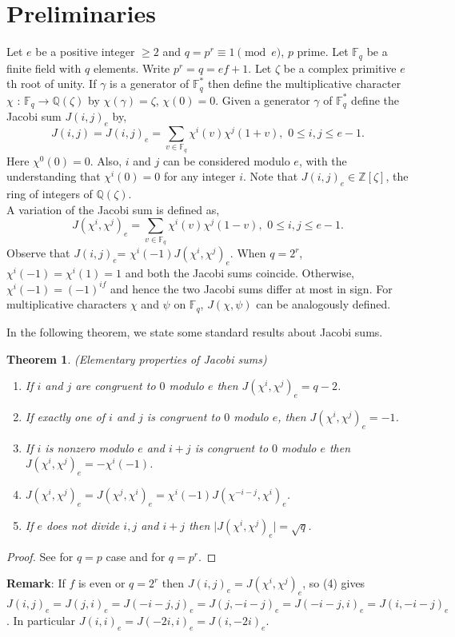 \documentclass[a4paper,12pt]{article}
\newtheorem{theorem}{Theorem}[section]
\def\F{{\mathbb F}}
\def\Q{{\mathbb Q}}                               %
\def\Z{{\mathbb Z}}                               %
\def\vpmod{\!\!\!\pmod}
\begin{document}
\section{Preliminaries}
Let $e$ be a positive integer $\ge 2$ and  $q=p^{r}\equiv 1\vpmod{e}$, $p$ prime. Let $\F_{q}$ be a finite field with $q$ elements. Write $p^{r}=q= ef + 1$. Let $\zeta$ be a complex primitive $e$th root of unity. If $\gamma$ is a generator of $\F_{q}^{*}$ then define the multiplicative character $\chi$ : $\F_{q}\rightarrow \Q(\zeta)$ by $\chi(\gamma) =\zeta$, $\chi(0)= 0$.
\noindent Given a generator $\gamma$ of $\F_{q}^{*}$ define the Jacobi sum $J(i,j)_{e}$ by,
$$J(i,j) = J(i,j)_{e} = \sum_{v\in \F_{q}}\chi^{i}(v)\chi^{j}(1+v),\,\, 0\leq i,j\leq e-1.$$
Here $\chi^{0}(0) = 0$. Also, $i$ and $j$ can be considered modulo $e$, with the understanding that $\chi^{i}(0) = 0$ for any integer $i$. Note that $J(i,j)_{e} \in \Z[\zeta]$, the ring of integers of $\Q(\zeta).$\\
\indent A variation of the Jacobi sum is defined as,
$$J(\chi^{i},\chi^{j})_{e} = \sum_{v\in \F_{q}}\chi^{i}(v)\chi^{j}(1-v),\,\,0\leq i, j\leq e-1.$$
Observe that $J(i,j)_{e}$= $\chi^{i}(-1)J(\chi^{i},\chi^{j})_{e}$. 
When $q = 2^r$, $\chi^{i}(-1) = \chi^{i}(1) =1$ and both the Jacobi sums coincide. 
Otherwise, $\chi^{i}(-1) = (-1)^{if}$ and hence the two Jacobi sums differ at most in sign.
 For multiplicative characters $\chi$ and $\psi$ on $\F_{q}$, $J(\chi,\psi)$ can be
 analogously defined.


In the following theorem, we state some standard results about Jacobi sums.
\begin{theorem}\label{thm:theorem1}(Elementary properties of Jacobi sums)
\begin{enumerate}
\item[1)] If $i$ and $j$ are congruent to $0$ modulo $e$ then $J(\chi^{i},\chi^{j})_{e} = q - 2$. 
\item[2)] If exactly one of $i$ and $j$ is congruent to $0$ modulo $e$, then $J(\chi^{i},\chi^{j})_{e} = -1$. 
\item[3)] If $i$ is nonzero modulo $e$ and $i+j$ is congruent to $0$ modulo $e$ then  $J(\chi^{i},\chi^{j})_{e} = -\chi^{i}(-1)$.
\item[4)] $J(\chi^{i},\chi^{j})_{e} = J(\chi^{j},\chi^{i})_{e} = \chi^{i}(-1)J(\chi^{-i-j}, \chi^{i})_{e}$.
\item[5)] If $e$ does not divide $i,j$ and $i + j$ then $\mid J(\chi^{i},\chi^{j})_{e}\mid  =  \sqrt{q}$.
\end{enumerate}
\end{theorem}
\begin{proof} See \cite {2} for $q = p$ case and \cite{16} for $q = p^r$.\end{proof}
\noindent \textbf{Remark}: If $f$ is even or $q =2^r$ then $J(i,j)_e = J(\chi^i, \chi^j)_e$, so (4) gives $J(i,j)_e = J(j,i)_e = J(-i-j,j)_e = J(j,-i-j)_e = J(-i-j,i)_e = J(i,-i-j)_e$. In particular $J(i,i)_e = J(-2i,i)_e = J(i, -2i)_e$.
\end{document}
